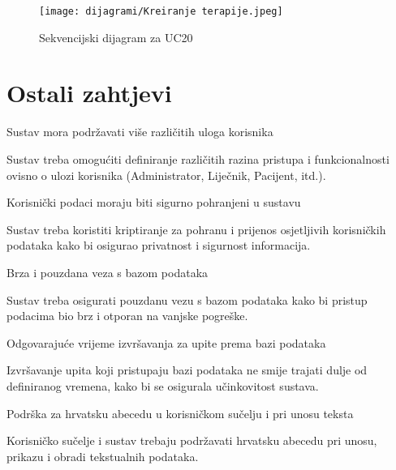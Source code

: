 \begin{figure}[H]
	\texttt{[image: dijagrami/Kreiranje terapije.jpeg]}
	\centering
	\caption{Sekvencijski dijagram za UC20}
	\label{fig:SequenceDiagram3}
\end{figure}

\eject

\section{Ostali zahtjevi}

\begin{packed_enum}
	
	\large \item Sustav mora podržavati više različitih uloga korisnika \normalsize
	\begin{packed_item}
		\item Sustav treba omogućiti definiranje različitih razina pristupa i funkcionalnosti ovisno o ulozi korisnika (Administrator, Liječnik, Pacijent, itd.).
	\end{packed_item}
	\large \item Korisnički podaci moraju biti sigurno pohranjeni u sustavu	\normalsize
	\begin{packed_item}
		\item Sustav treba koristiti kriptiranje za pohranu i prijenos osjetljivih korisničkih podataka kako bi osigurao privatnost i sigurnost informacija.
	\end{packed_item}
	\large \item Brza i pouzdana veza s bazom podataka \normalsize
	\begin{packed_item}
		\item Sustav treba osigurati pouzdanu vezu s bazom podataka kako bi pristup podacima bio brz i otporan na vanjske pogreške.
	\end{packed_item}
	\large \item Odgovarajuće vrijeme izvršavanja za upite prema bazi podataka \normalsize
	\begin{packed_item}
		\item Izvršavanje upita koji pristupaju bazi podataka ne smije trajati dulje od definiranog vremena, kako bi se osigurala učinkovitost sustava.
	\end{packed_item}
	\large \item Podrška za hrvatsku abecedu u korisničkom sučelju i pri unosu teksta \normalsize
	\begin{packed_item}
		\item Korisničko sučelje i sustav trebaju podržavati hrvatsku abecedu pri unosu, prikazu i obradi tekstualnih podataka.

\end{packed_item}
\end{packed_enum}
